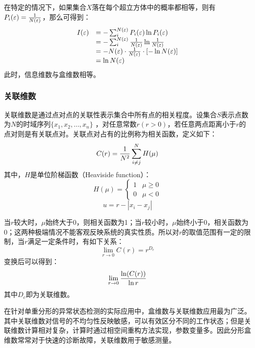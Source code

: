 在特定的情况下，如果集合$X$落在每个超立方体中的概率都相等，则有$P_i(\varepsilon) = {1 \over N(\varepsilon)}$，那么可得到：
\begin{equation}
\begin{array}{cl}
I(\varepsilon)& = -\sum_{i}^{N(\varepsilon)} P_i(\varepsilon) \ln P_i(\varepsilon)\\
{}& = -\sum_{i}^{N(\varepsilon)} {1\over N(\varepsilon) } \ln   {1\over N(\varepsilon) } \\
{}& = -N(\varepsilon) \cdot {1\over N(\varepsilon) } \cdot [-\ln N(\varepsilon)]\\
{}& = \ln N(\varepsilon) \\
\end{array}
\end{equation}
此时，信息维数与盒维数相等。

\subsubsection{关联维数}
关联维数是通过点对点的关联性表示集合中所有点的相关程度。设集合$S$表示点数为$N$的时域序列$\{ x_1,x_2,\dots,x_n \}$ ，对任意常数$r(r>0)$，若任意两点距离小于$r$的点对则是有关联点对。关联点对占有的比例称为相关函数，定义如下：
\begin{equation}
C(r) = {1\over N^2} \sum_{i \neq j}^{N} H(\mu)
\end{equation}
其中，$H$是单位阶梯函数（Heaviside function）：
$$ H(\mu) = \left\lbrace \begin{array}{cl}
1& \mu \geqslant 0 \\
0& \mu <0
\end{array} \right.  $$
$$ u = r-\left| x_i-x_j \right|  $$

当$r$较大时，$\mu$始终大于0，则相关函数为1；当$r$较小时，$\mu
$始终小于0，相关函数为0；这两种极端情况不能客观反映系统的真实性质。所以对$r$的取值范围有一定的限制，当$r$满足一定条件时，有如下关系：
\begin{equation}
\lim \limits_{r\rightarrow0}C(r) = r^{D_c}
\end{equation}
变换后可以得到：
\begin{equation}
\lim \limits_{r\rightarrow0}{\ln (C(r)) \over \ln r}
\end{equation}
其中$D_c$即为关联维数。

在针对单重分形的异常状态检测的实际应用中，盒维数与关联维数应用最为广泛。其中关联维数对信号的不均匀性反映敏感，可以有效区分不同的工作状态；但是关联维数计算相对复杂，计算时通过相空间重构方法实现，参数变量多。因此分形盒维数常常对于快速的诊断故障，关联维数用于敏感测量。

